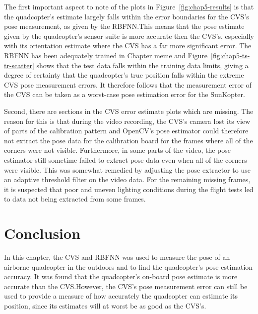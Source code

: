 The first important aspect to note of the plots in Figure~\ref{fig:chap5-results} is that the quadcopter's estimate largely falls within the error boundaries for the CVS's pose measurement, as given by the RBFNN.\@ This means that the pose estimate given by the quadcopter's sensor suite is more accurate then the CVS's, especially with its orientation estimate where the CVS has a far more significant error. The RBFNN has been adequately trained in Chapter meme and Figure~\ref{fig:chap5-ts-tr-scatter} shows that the test data falls within the training data limits, giving a degree of certainty that the quadcopter's true position falls within the extreme CVS pose measurement errors. It therefore follows that the measurement error of the CVS can be taken as a worst-case pose estimation error for the SunKopter. 

Second, there are sections in the CVS error estimate plots which are missing. The reason for this is that during the video recording, the CVS's camera lost its view of parts of the calibration pattern and OpenCV's pose estimator could therefore not extract the pose data for the calibration board for the frames where all of the corners were not visible. Furthermore, in some parts of the video, the pose estimator still sometime failed to extract pose data even when all of the corners were visible. This was somewhat remedied by adjusting the pose extractor to use an adaptive threshold filter on the video data. For the remaining missing frames, it is suspected that poor and uneven lighting conditions during the flight tests led to data not being extracted from some frames. 

\section{Conclusion}

In this chapter, the CVS and RBFNN was used to measure the pose of an airborne quadcopter in the outdoors and to find the quadcopter's pose estimation accuracy. It was found that the quadcopter's on-board pose estimate is more accurate than the CVS.\@ However, the CVS's pose measurement error can still be used to provide a measure of how accurately the quadcopter can estimate its position, since its estimates will at worst be as good as the CVS's.\@ 
